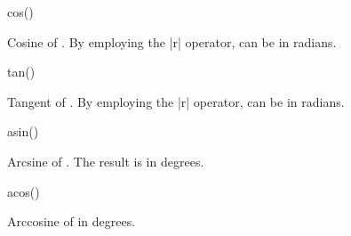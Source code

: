 \begin{math-function}{cos()}

	Cosine of . By employing the |r| operator,  can be in 
	radians.

\begin{codeexample}[post=\tt\footnotesize\pgfmathresult]
\end{codeexample}

\begin{codeexample}[post=\tt\footnotesize\pgfmathresult]
\end{codeexample}

\end{math-function}

\begin{math-function}{tan()}

	Tangent of . By employing the |r| operator,  can be in 
	radians.
	
\begin{codeexample}[post=\tt\footnotesize\pgfmathresult]
\end{codeexample}

\begin{codeexample}[post=\tt\footnotesize\pgfmathresult]
\end{codeexample}

\end{math-function}

\begin{math-function}{asin()}

	Arcsine of . The result is in degrees.

\begin{codeexample}[post=\tt\footnotesize\pgfmathresult]
\end{codeexample}

\end{math-function}

\begin{math-function}{acos()}

	Arccosine of  in degrees.  

\begin{codeexample}[post=\tt\footnotesize\pgfmathresult]
\end{codeexample}

\end{math-function}

